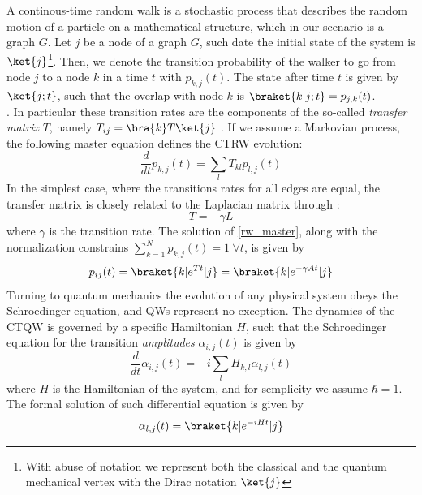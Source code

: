 A continous-time random walk is a stochastic process that describes the random motion of a particle on a mathematical structure, which in our scenario is a graph $G$.
Let $j$ be a node of a graph $G$, such date the initial state of the system is $\ket{j}$\footnote{With abuse of notation we represent both the classical and the quantum mechanical vertex with the Dirac notation $\ket{j}$}. Then, we denote the transition probability of the walker to go from node $j$ to a node $k$ in a time $t$ with $p_{k,j}(t)$. The state after time $t$ is given by $\ket{j;t}$, such that the overlap with node $k$ is $\braket{k|j;t}=p_{j,k}(t)$. \\
. In particular these transition rates are the components of the so-called \textit{transfer matrix} $T$, namely $T_{ij}= \bra{k}T\ket{j}$ . If we assume a Markovian process, the following master equation defines the CTRW evolution:
\begin{equation}
  \frac{d}{dt}p_{k,j}(t) = \sum_{l}T_{kl}p_{l,j}(t)
  \label{rw_master}
\end{equation}
In the simplest case, where the transitions rates for all edges are equal, the transfer matrix is closely related to the Laplacian matrix through :
\begin{equation}
  T = -\gamma L
\end{equation}
where $\gamma$ is the transition rate. The solution of \cref{rw_master}, along with the normalization constrains $\sum_{k=1}^{N}p_{k,j}(t) = 1 \hspace{3pt} \forall t$, is given by
\begin{equation}
  p_{ij}(t)= \braket{k|e^{Tt}|j} = \braket{k|e^{-\gamma At}|j}
\end{equation}
Turning to quantum mechanics the evolution of any physical system obeys the Schroedinger equation, and QWs represent no exception. The dynamics of the CTQW is governed by a specific Hamiltonian $H$, such that the Schroedinger equation for the transition \textit{amplitudes} $\alpha_{i,j}(t)$ is given by
\begin{equation}
  \frac{d}{dt}\alpha_{i,j}(t) = -i \sum_{l}H_{k,l}\alpha_{l,j}(t)
\end{equation}
where $H$ is the Hamiltonian of the system, and for semplicity we assume $\hbar = 1$. The formal solution of such differential equation is given by
\begin{equation}
  \alpha_{l,j}(t) = \braket{k|e^{-iHt}|j}
  \label{qw_master}
\end{equation}
